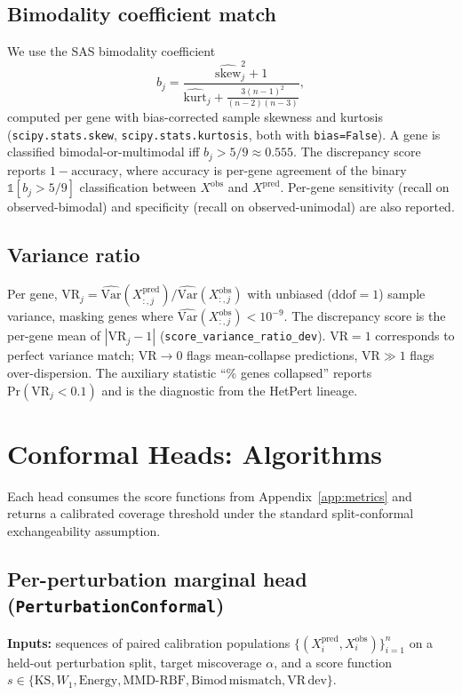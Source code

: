 \documentclass{article}
\begin{document}
\subsection{Bimodality coefficient match}
We use the SAS bimodality coefficient
\begin{equation}
b_j = \frac{\widehat{\mathrm{skew}}_j^2 + 1}{\widehat{\mathrm{kurt}}_j + \frac{3 (n - 1)^2}{(n - 2)(n - 3)}},
\end{equation}
computed per gene with bias-corrected sample skewness and kurtosis (\texttt{scipy.stats.skew}, \texttt{scipy.stats.kurtosis}, both with \texttt{bias=False}). A gene is classified bimodal-or-multimodal iff $b_j > 5/9 \approx 0.555$. The discrepancy score reports $1 - \mathrm{accuracy}$, where accuracy is per-gene agreement of the binary $\mathbb{1}[b_j > 5/9]$ classification between $X^{\text{obs}}$ and $X^{\text{pred}}$. Per-gene sensitivity (recall on observed-bimodal) and specificity (recall on observed-unimodal) are also reported.

\subsection{Variance ratio}
Per gene, $\mathrm{VR}_j = \widehat{\mathrm{Var}}(X^{\text{pred}}_{:, j}) / \widehat{\mathrm{Var}}(X^{\text{obs}}_{:, j})$ with unbiased ($\mathrm{ddof}=1$) sample variance, masking genes where $\widehat{\mathrm{Var}}(X^{\text{obs}}_{:, j}) < 10^{-9}$. The discrepancy score is the per-gene mean of $|\mathrm{VR}_j - 1|$ (\texttt{score\_variance\_ratio\_dev}). $\mathrm{VR} = 1$ corresponds to perfect variance match; $\mathrm{VR} \to 0$ flags mean-collapse predictions, $\mathrm{VR} \gg 1$ flags over-dispersion. The auxiliary statistic ``\% genes collapsed'' reports $\mathrm{Pr}(\mathrm{VR}_j < 0.1)$ and is the diagnostic from the HetPert lineage.

\section{Conformal Heads: Algorithms}
\label{app:conformal}

Each head consumes the score functions from Appendix~\ref{app:metrics} and returns a calibrated coverage threshold under the standard split-conformal exchangeability assumption.

\subsection{Per-perturbation marginal head (\texttt{PerturbationConformal})}
\textbf{Inputs:} sequences of paired calibration populations $\{(X^{\text{pred}}_i, X^{\text{obs}}_i)\}_{i=1}^{n}$ on a held-out perturbation split, target miscoverage $\alpha$, and a score function $s \in \{\mathrm{KS}, W_1, \mathrm{Energy}, \mathrm{MMD\text{-}RBF}, \mathrm{Bimod\,mismatch}, \mathrm{VR\,dev}\}$.
\end{document}
